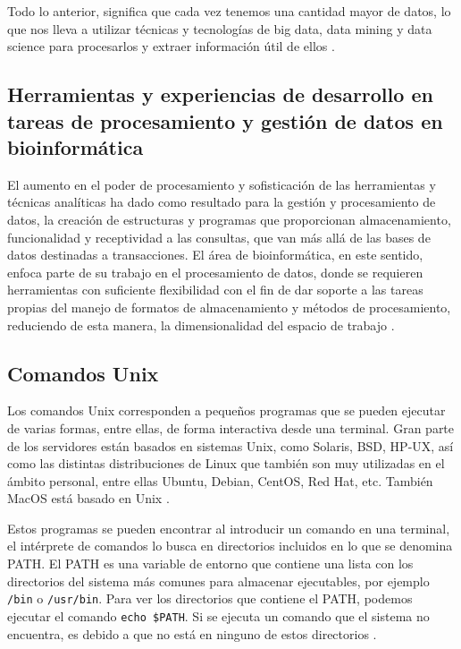 \documentclass[12pt]{article}
\begin{document}
Todo lo anterior, significa que cada vez tenemos una cantidad mayor de datos, 
lo que nos lleva a utilizar técnicas y tecnologías de big data, data mining y 
data science para procesarlos y extraer información útil de ellos \cite{Moran}.

\subsection*{Herramientas y experiencias de desarrollo en tareas de procesamiento y gestión de datos en bioinformática}

El aumento en el poder de procesamiento y sofisticación de las herramientas y técnicas 
analíticas ha dado como resultado para la gestión y procesamiento de datos, la 
creación de estructuras y programas que proporcionan almacenamiento, funcionalidad y 
receptividad a las consultas, que van más allá de las bases de datos destinadas a 
transacciones. El área de bioinformática, en este sentido, enfoca parte de su trabajo 
en el procesamiento de datos, donde se requieren herramientas con suficiente flexibilidad 
con el fin de dar soporte a las tareas propias del manejo de formatos de almacenamiento y 
métodos de procesamiento, reduciendo de esta manera, la dimensionalidad del espacio de 
trabajo \cite{Hadad}.

\subsection*{Comandos Unix}

Los comandos Unix corresponden a  pequeños programas que se pueden ejecutar de varias 
formas, entre ellas, de forma interactiva desde una terminal. Gran parte de los servidores 
están basados en sistemas Unix, como Solaris, BSD, HP-UX, así como las distintas 
distribuciones de Linux que también son muy utilizadas en el ámbito personal, entre 
ellas Ubuntu, Debian, CentOS, Red Hat, etc. También MacOS está basado en Unix \cite{Unix}.

Estos programas se pueden encontrar  al introducir un comando en una terminal, el 
intérprete de comandos lo busca en directorios incluidos en lo que se denomina PATH. El PATH 
es una variable de entorno que contiene una lista con los directorios del sistema 
más comunes para almacenar ejecutables, por ejemplo \texttt{/bin} o \texttt{/usr/bin}. Para ver los 
directorios que contiene el PATH, podemos ejecutar el comando \texttt{echo \$PATH}. Si se 
ejecuta un comando que el sistema no encuentra, es debido a que no está en ninguno de 
estos directorios \cite{Unix}.
\end{document}
